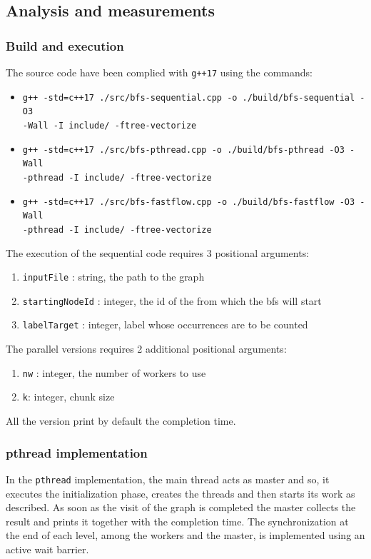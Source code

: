 \subsection{Analysis and measurements}
\subsubsection{Build and execution}
The source code have been complied with \texttt{g++17} using the commands:
\begin{itemize}
    \item \texttt{g++ -std=c++17  ./src/bfs-sequential.cpp -o ./build/bfs-sequential -O3} \\ \texttt{-Wall -I include/ -ftree-vectorize }
    \item \texttt{g++ -std=c++17  ./src/bfs-pthread.cpp -o ./build/bfs-pthread -O3 -Wall} \\ \texttt{-pthread -I include/ -ftree-vectorize }
    \item \texttt{g++ -std=c++17  ./src/bfs-fastflow.cpp -o ./build/bfs-fastflow -O3 -Wall}\\ \texttt{-pthread -I include/ -ftree-vectorize }
\end{itemize}
The execution of the sequential code requires 3 positional arguments:
\begin{enumerate}
    \item \texttt{inputFile} : string, the path to the graph
    \item \texttt{startingNodeId} : integer, the id of the from which the bfs will start
    \item \texttt{labelTarget} : integer, label whose occurrences are to be counted
\end{enumerate}
The parallel versions requires 2 additional positional arguments:
\begin{enumerate}
    \item \texttt{nw} : integer, the number of workers to use
    \item \texttt{k}: integer, chunk size
\end{enumerate}
All the version print by default the completion time.

\subsubsection{pthread implementation}
In the \texttt{pthread} implementation, the main thread acts as master and so, 
it executes the initialization phase, creates 
the threads and then starts its work as described. As soon as the visit of the graph
is completed the master collects the result and prints it together with the completion time.
 The synchronization at the end of each level, among the workers and the master, 
is implemented using an active wait barrier.

